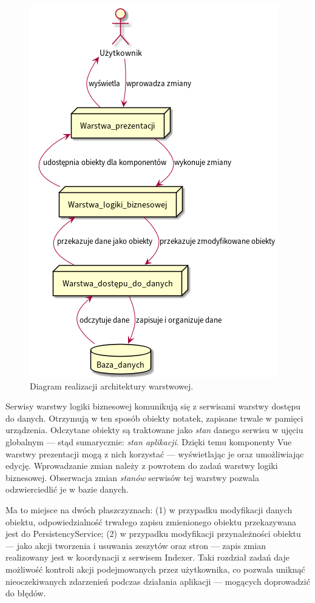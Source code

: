 \begin{figure}[H]
	\begin{center}
		\includegraphics[scale=0.7]{media/Architecture.png}
	\end{center}
	\caption{Diagram realizacji architektury warstwowej.}
	\label{rys:architecture}
\end{figure}

Serwisy warstwy logiki biznesowej komunikują się z serwisami warstwy dostępu do danych.
Otrzymują w ten sposób obiekty notatek, zapisane trwale w pamięci urządzenia.
Odczytane obiekty są traktowane jako \textit{stan} danego serwisu w ujęciu globalnym — stąd sumarycznie: \textit{stan aplikacji}.
Dzięki temu komponenty Vue warstwy prezentacji mogą z nich korzystać — wyświetlając je oraz umożliwiając edycję.
Wprowadzanie zmian należy z powrotem do zadań warstwy logiki biznesowej. Obserwacja zmian \textit{stanów} serwisów tej warstwy
pozwala odzwierciedlić je w bazie danych.

Ma to miejsce na dwóch płaszczyznach: (1) w przypadku modyfikacji danych obiektu,
odpowiedzialność trwałego zapisu zmienionego obiektu przekazywana jest do PersistencyService;
(2) w przypadku modyfikacji przynależności obiektu — jako akcji
tworzenia i usuwania zeszytów oraz stron — zapis zmian realizowany jest w koordynacji z serwisem Indexer.
Taki rozdział zadań daje możliwość kontroli akcji podejmowanych przez użytkownika, co pozwala uniknąć nieoczekiwanych
zdarzenień podczas działania aplikacji — mogących doprowadzić do błędów.

